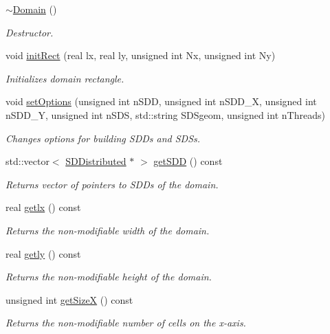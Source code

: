 \begin{DoxyCompactItemize}
\mbox{\label{classDomain_a29cec9afb2e54c810ba1f3c1a49543a8}} 
\hyperlink{classDomain_a29cec9afb2e54c810ba1f3c1a49543a8}{$\sim$\+Domain} ()
\begin{DoxyCompactList}\small\item\em Destructor. \end{DoxyCompactList}\item 
void \hyperlink{classDomain_a853266061b629ff1f920b46c06c478d6}{init\+Rect} (real lx, real ly, unsigned int Nx, unsigned int Ny)
\begin{DoxyCompactList}\small\item\em Initializes domain rectangle. \end{DoxyCompactList}\item 
void \hyperlink{classDomain_a10a5e8384b21bb3c968699c2a6c89bf7}{set\+Options} (unsigned int n\+S\+DD, unsigned int n\+S\+D\+D\+\_\+X, unsigned int n\+S\+D\+D\+\_\+Y, unsigned int n\+S\+DS, std\+::string S\+D\+Sgeom, unsigned int n\+Threads)
\begin{DoxyCompactList}\small\item\em Changes options for building S\+D\+Ds and S\+D\+Ss. \end{DoxyCompactList}\item 
std\+::vector$<$ \hyperlink{classSDDistributed}{S\+D\+Distributed} $\ast$ $>$ \hyperlink{classDomain_ae560ad14f723c01663bbb783ede30fd8}{get\+S\+DD} () const
\begin{DoxyCompactList}\small\item\em Returns vector of pointers to S\+D\+Ds of the domain. \end{DoxyCompactList}\item 
real \hyperlink{classDomain_a510afad91fe81eb2ccef203a980f4223}{getlx} () const
\begin{DoxyCompactList}\small\item\em Returns the non-\/modifiable width of the domain. \end{DoxyCompactList}\item 
real \hyperlink{classDomain_ac9cedab179bb0611fc0e9fcfbcedb835}{getly} () const
\begin{DoxyCompactList}\small\item\em Returns the non-\/modifiable height of the domain. \end{DoxyCompactList}\item 
unsigned int \hyperlink{classDomain_a75f299e3871fe9cec01637b140429ef9}{get\+SizeX} () const
\begin{DoxyCompactList}\small\item\em Returns the non-\/modifiable number of cells on the x-\/axis. \end{DoxyCompactList}\item 

\end{DoxyCompactItemize}
